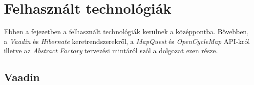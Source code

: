 



\setlength{\parindent}{4em}
\setlength{\parskip}{1em}
\chapter{Felhasznált technológiák}\label{ch:FELH}

\begin{osszefoglal}
	Ebben a fejezetben a felhasznált technológiák kerülnek a középpontba. Bővebben, a \textit{Vaadin}\cite{Vaadin} és \textit{Hibernate}\cite{Hibernate} keretrendszerekről,  a \textit{MapQuest}\cite{MapQuestJsApi} és \textit{OpenCycleMap}\cite{OpenCycleMap} API-król illetve az \textit{Abstract Factory} tervezési mintáról szól a dolgozat ezen része.
\end{osszefoglal}

\section{Vaadin}\label{sec:FELH:va}


